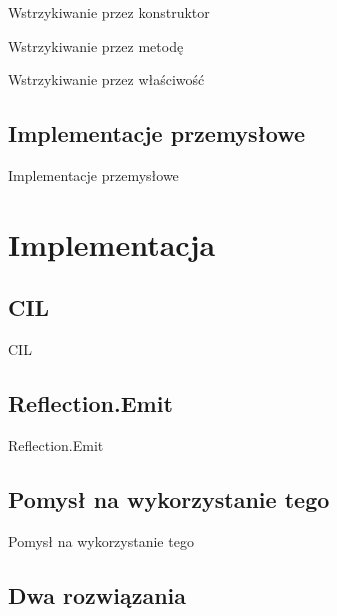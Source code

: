 \documentclass{beamer}
\begin{document}
\begin{frame}{Wstrzykiwanie przez konstruktor}
\end{frame}

\begin{frame}{Wstrzykiwanie przez metodę}
\end{frame}

\begin{frame}{Wstrzykiwanie przez właściwość}
\end{frame}


\subsection{Implementacje przemysłowe}

\begin{frame}{Implementacje przemysłowe}
\end{frame}



\section{Implementacja}

\subsection{CIL}

\begin{frame}{CIL}
\end{frame}


\subsection{Reflection.Emit}

\begin{frame}{Reflection.Emit}
\end{frame}


\subsection{Pomysł na wykorzystanie tego}

\begin{frame}{Pomysł na wykorzystanie tego}
\end{frame}


\subsection{Dwa rozwiązania}
\end{document}

